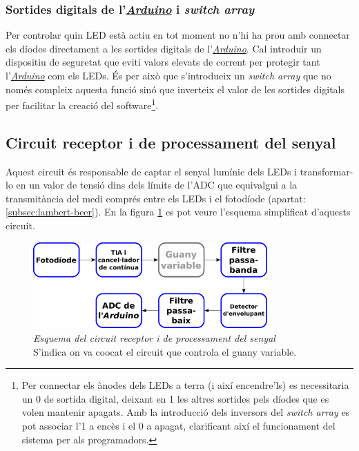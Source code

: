 \subsubsection{Sortides digitals de l'\hyperref[subsec:arduino]{\textit{Arduino}} i \textit{switch array}}

Per controlar quin \ac{LED} està actiu en tot moment no n'hi ha prou amb connectar els díodes directament a les sortides digitals de l'\hyperref[subsec:arduino]{\textit{Arduino}}. Cal introduir un dispositiu de seguretat que eviti valors elevats de corrent per protegir tant l'\hyperref[subsec:arduino]{\textit{Arduino}} com els \acp{LED}. És per això que s'introdueix un \textit{switch array} que no només compleix aquesta funció sinó que inverteix el valor de les sortides digitals per facilitar la creació del software\footnote{Per connectar els ànodes dels \acp{LED} a terra (i així encendre'ls) es necessitaria un \num{0} de sortida digital, deixant en \num{1} les altres sortides pels díodes que es volen mantenir apagats. Amb la introducció dels inversors del \textit{switch array} es pot associar l'\num{1} a encès i el \num{0} a apagat, clarificant  així el funcionament del sistema per als programadors.}.

\subsection{Circuit receptor i de processament del senyal}\label{subsec:circuit_receptor}

Aquest circuit és responsable de captar el senyal lumínic dels \acp{LED} i transformar-lo en un valor de tensió dins dels límits de l'\ac{ADC} que equivalgui a la transmitància del medi comprés entre els \acp{LED} i el fotodíode (apartat: \ref{subsec:lambert-beer}). En la figura \ref{fig:esquema_circuit_receptor_1} es pot veure l'esquema simplificat d'aquests circuit.

\begin{figure}[htp]
	\centering
	\includegraphics[width=0.8\textwidth]{Figures/esquema_circuit_receptor_1.pdf}
	\caption[Esquema del circuit receptor i de processament del senyal]{\textit{Esquema del circuit receptor i de processament del senyal}\\{\footnotesize S'indica on va co\lgem ocat el circuit que controla el guany variable.}}
	\label{fig:esquema_circuit_receptor_1}
\end{figure}

